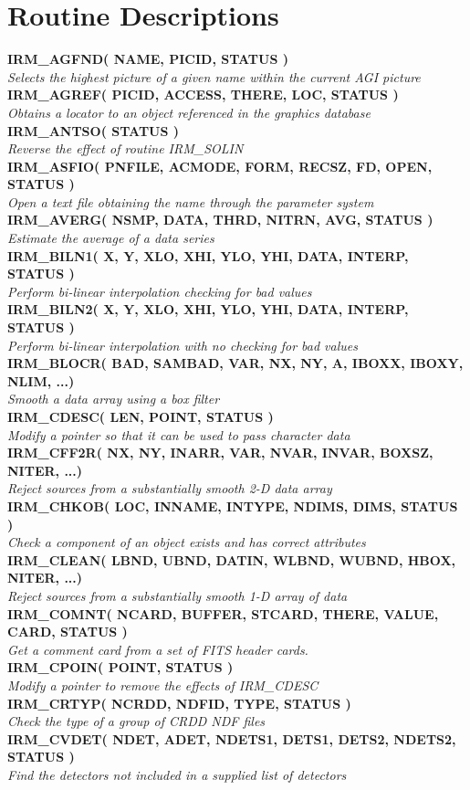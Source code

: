 \appendix
\section {Routine Descriptions}
\label {APP:ROUTS}

\newcommand{\noteroutine}[2]{{\small \bf #1} \\
                              \hspace*{3em} {\em #2} \\[1.5ex]}
\noteroutine{IRM\_AGFND( NAME, PICID, STATUS )}
  {Selects the highest picture of a given name within the current AGI picture}
\noteroutine{IRM\_AGREF( PICID, ACCESS, THERE, LOC, STATUS )}
  {Obtains a locator to an object referenced in the graphics database}
\noteroutine{IRM\_ANTSO( STATUS )}
  {Reverse the effect of routine IRM\_SOLIN}
\noteroutine{IRM\_ASFIO( PNFILE, ACMODE, FORM, RECSZ, FD, OPEN, STATUS )}
  {Open a text file obtaining the name through the parameter system}
\noteroutine{IRM\_AVERG(  NSMP, DATA, THRD, NITRN, AVG, STATUS )}
  {Estimate the average of a data series}
\noteroutine{IRM\_BILN1( X, Y, XLO, XHI, YLO, YHI, DATA, INTERP, STATUS )}
  {Perform bi-linear interpolation checking for bad values}
\noteroutine{IRM\_BILN2( X, Y, XLO, XHI, YLO, YHI, DATA, INTERP, STATUS )}
  {Perform bi-linear interpolation with no checking for bad values}
\noteroutine{IRM\_BLOCR( BAD, SAMBAD, VAR, NX, NY, A, IBOXX, IBOXY, NLIM, ...)}
  {Smooth a data array using a box filter}
\noteroutine{IRM\_CDESC( LEN, POINT, STATUS )}
  {Modify a pointer so that it can be used to pass character data}
\noteroutine{IRM\_CFF2R( NX, NY, INARR, VAR, NVAR, INVAR, BOXSZ, NITER, ...)}
  {Reject sources from a substantially smooth 2-D data array}
\noteroutine{IRM\_CHKOB( LOC, INNAME, INTYPE, NDIMS, DIMS, STATUS )}
  {Check a component of an object exists and has correct attributes}
\noteroutine{IRM\_CLEAN( LBND, UBND, DATIN, WLBND, WUBND, HBOX, NITER, ...)}
  {Reject sources from a substantially smooth 1-D array of data}
\noteroutine{IRM\_COMNT( NCARD, BUFFER, STCARD, THERE, VALUE, CARD, STATUS )}
  {Get a comment card from a set of FITS header cards.}
\noteroutine{IRM\_CPOIN( POINT, STATUS )}
  {Modify a pointer to remove the effects of IRM\_CDESC}
\noteroutine{IRM\_CRTYP( NCRDD, NDFID, TYPE, STATUS )}
  {Check the type of a group of CRDD NDF files}
\noteroutine{IRM\_CVDET( NDET, ADET, NDETS1, DETS1, DETS2, NDETS2, STATUS )}
  {Find the detectors not included in a supplied list of detectors}
